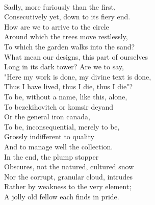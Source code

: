 \documentclass[smalldemyvopaper,11pt,twoside,onecolumn,openright,extrafontsizes]{memoir}
\begin{document}
\\Sadly, more furiously than the first,
\\Consecutively yet, down to its fiery end.
\\How are we to arrive to the circle
\\Around which the trees move restlessly,
\\To which the garden walks into the sand?
\\What mean our designs, this part of ourselves
\\Long in its dark tower? Are we to say,
\\"Here my work is done, my divine text is done,
\\Thus I have lived, thus I die, thus I die"?
\\To be, without a name, like this, alone,
\\To bezekihovitch or komsir deyand
\\Or the general iron canada,
\\To be, inconsequential, merely to be,
\\Grossly indifferent to quality
\\And to manage well the collection.
\\In the end, the plump stopper
\\Obscures, not the natured, cultured snow
\\Nor the corrupt, granular cloud, intrudes
\\Rather by weakness to the very element;
\\A jolly old fellow each finds in pride.
\end{document}
